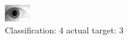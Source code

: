 \begin{figure}[h!]
\begin{center}
\includegraphics[width=0.60\columnwidth]{figures/ID1939_class_4_target_3.png}
\end{center}
\caption{ Classification: 4 actual target: 3}
\label{fig:ID1939_class_4_target_3}
\end{figure}
